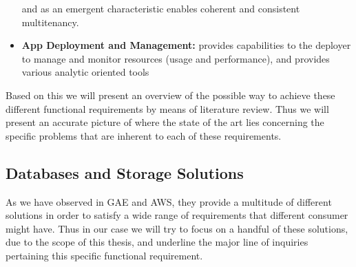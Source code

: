 \documentclass[11pt]{amsart}
\begin{document}
\begin{enumarate}
\begin{itemize}
              and as an emergent characteristic enables coherent and consistent
              multitenancy. 
            \item \textbf{App Deployment and Management:} provides capabilities to the
              deployer to manage and monitor resources (usage and performance), and
              provides various analytic oriented tools 
          \end{itemize}
          Based on this we will present an overview of the possible way to achieve these
          different functional requirements by means of literature review. Thus we will
          present an accurate picture of where the state of the art lies concerning the
          specific problems that are inherent to each of these requirements.
         
          \subsection{Databases and Storage Solutions}
          As we have observed in GAE and AWS, they provide a multitude of different
          solutions in order to satisfy a wide range of requirements that different
          consumer might have. Thus in our case we will try to focus on a handful of these
          solutions, due to the scope of this thesis, and underline the major line of
          inquiries pertaining this specific functional requirement.


\end{enumarate}
\end{document}
